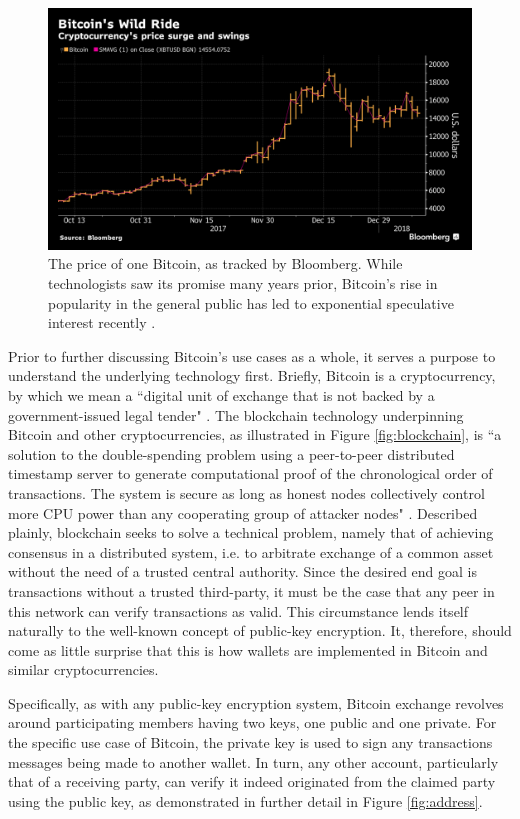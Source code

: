 \documentclass{article}
\begin{document}
\begin{figure}[H]
    \centering
    \includegraphics[width=.50\textwidth]{BTC_price.png}
    \caption[Bitcoin Price]{The price of one Bitcoin, as tracked by Bloomberg. While technologists saw its promise many years prior, Bitcoin's rise in popularity in the general public has led to exponential speculative interest recently \cite{goldman}.}
    \label{fig:BTC_price}
\end{figure}

Prior to further discussing Bitcoin's use cases as a whole, it serves a purpose to understand the underlying technology first. Briefly, Bitcoin is a cryptocurrency, by which we mean a ``digital unit of exchange that is not backed by a government-issued legal tender" \cite{virtual}. The blockchain technology underpinning Bitcoin and other cryptocurrencies, as illustrated in Figure \ref{fig:blockchain}, is ``a solution to the double-spending problem using a peer-to-peer distributed timestamp server to generate computational proof of the chronological order of transactions. The system is secure as long as honest nodes collectively control more CPU power than any cooperating group of attacker nodes" \cite{bitcoin}. Described plainly, blockchain seeks to solve a technical problem, namely that of achieving consensus in a distributed system, i.e. to arbitrate exchange of a common asset without the need of a trusted central authority. Since the desired end goal is transactions without a trusted third-party, it must be the case that any peer in this network can verify transactions as valid. This circumstance lends itself naturally to the well-known concept of public-key encryption. It, therefore, should come as little surprise that this is how wallets are implemented in Bitcoin and similar cryptocurrencies.

Specifically, as with any public-key encryption system, Bitcoin exchange revolves around participating members having two keys, one public and one private. For the specific use case of Bitcoin, the private key is used to sign any transactions messages being made to another wallet. In turn, any other account, particularly that of a receiving party, can verify it indeed originated from the claimed party using the public key, as demonstrated in further detail in Figure \ref{fig:address}.
\end{document}
